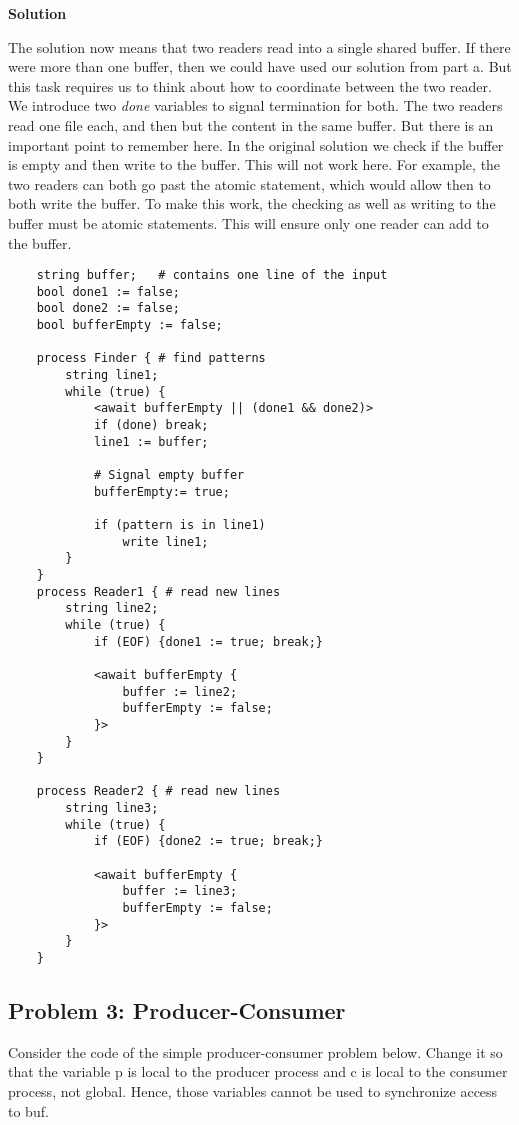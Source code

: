 \textbf{Solution}

The solution now means that two readers read into a single shared buffer. If there were more than one buffer, then we could have used our solution from part a.
But this task requires us to think about how to coordinate between the two reader. We introduce two \textit{done} variables to signal termination for both. 
The two readers read one file each, and then but the content in the same buffer. But there is an important point to remember here. 
In the original solution we check if the buffer is empty and then write to the buffer. This will not work here. For example, the two readers can both go past the atomic statement, which would allow then to both write the buffer.
To make this work, the checking as well as writing to the buffer must be atomic statements. This will ensure only one reader can add to the buffer.

\begin{lstlisting}
    string buffer;   # contains one line of the input
    bool done1 := false;
    bool done2 := false; 
    bool bufferEmpty := false; 

    process Finder { # find patterns
        string line1;
        while (true) {
            <await bufferEmpty || (done1 && done2)>
            if (done) break;
            line1 := buffer;

            # Signal empty buffer 
            bufferEmpty:= true;
         
            if (pattern is in line1)
                write line1;
        }
    }
    process Reader1 { # read new lines
        string line2;
        while (true) {
            if (EOF) {done1 := true; break;}

            <await bufferEmpty {
                buffer := line2;
                bufferEmpty := false; 
            }>
        }
    }

    process Reader2 { # read new lines
        string line3;
        while (true) {
            if (EOF) {done2 := true; break;}

            <await bufferEmpty {
                buffer := line3;
                bufferEmpty := false; 
            }>
        }
    }
\end{lstlisting}


\subsection{Problem 3: Producer-Consumer}

Consider the code of the simple producer-consumer problem below. Change it so that the variable p is local to the producer process
and c is local to the consumer process, not global. Hence, those variables cannot be used to
synchronize access to buf.


